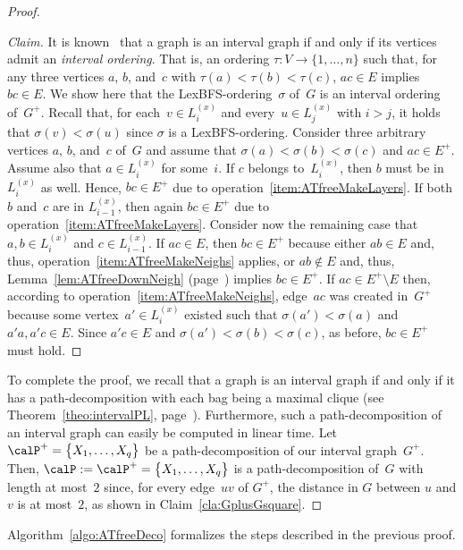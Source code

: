 \begin{proof}
\begin{proof}
    [Claim]
It is known~\cite{Olariu1991} that a graph is an interval graph if and only if its vertices admit an \emph{interval ordering}.
That is, an ordering $\tau \colon V \rightarrow \{ 1, \ldots, n \}$ such that, for any three vertices $a$, $b$, and~$c$ with $\tau(a) < \tau(b) < \tau(c)$, $ac \in E$ implies $bc \in E$.
We show here that the LexBFS-ordering~$\sigma$ of~$G$ is an interval ordering of~$G^+$.
Recall that, for each~$v \in L_i^{(x)}$ and every~$u \in L_j^{(x)}$ with $i > j$, it holds that $\sigma(v) < \sigma(u)$ since $\sigma$ is a LexBFS-ordering.
Consider three arbitrary vertices $a$, $b$, and~$c$ of~$G$ and assume that $\sigma(a) < \sigma(b) < \sigma(c)$ and $ac \in E^+$.
Assume also that $a \in L_i^{(x)}$ for some~$i$.
If $c$ belongs to~$L_i^{(x)}$, then $b$ must be in $L_i^{(x)}$ as well.
Hence, $bc \in E^+$ due to operation~\ref{item:ATfreeMakeLayers}.
If both $b$ and~$c$ are in $L_{i-1}^{(x)}$, then again $bc \in E^+$ due to operation~\ref{item:ATfreeMakeLayers}.
Consider now the remaining case that $a, b \in L_i^{(x)}$ and $c \in L_{i-1}^{(x)}$.
If $ac \in E$, then $bc \in E^+$ because either $ab \in E$ and, thus, operation~\ref{item:ATfreeMakeNeighs} applies, or $ab \notin E$ and, thus, Lemma~\ref{lem:ATfreeDownNeigh} (page~\pageref{lem:ATfreeDownNeigh}) implies $bc \in E^+$.
If $ac \in E^+ \setminus E$ then, according to operation~\ref{item:ATfreeMakeNeighs}, edge~$ac$ was created in~$G^+$ because some vertex~$a' \in L_i^{(x)}$ existed such that $\sigma(a') < \sigma(a)$ and $a'a, a'c \in E$.
Since $a'c \in E$ and $\sigma(a') < \sigma(b) < \sigma(c)$, as before, $bc \in E^+$ must hold.
\end{proof}

To complete the proof, we recall that a graph is an interval graph if and only if it has a path-decomposition with each bag being a maximal clique (see Theorem~\ref{theo:intervalPL}, page~\pageref{theo:intervalPL}).
Furthermore, such a path-decomposition of an interval graph can easily be computed in linear time.
Let $\calP^+ = \big \{ X_1, \ldots, X_q \big \}$ be a path-decomposition of our interval graph~$G^+$.
Then, $\calP := \calP^+ = \big \{ X_1, \ldots, X_q \big \}$ is a path-decomposition of~$G$ with length at most~$2$ since, for every edge~$uv$ of $G^+$, the distance in $G$ between $u$ and $v$ is at most~$2$, as shown in Claim~\ref{cla:GplusGsquare}.
\end{proof}

Algorithm~\ref{algo:ATfreeDeco} formalizes the steps described in the
previous proof.

